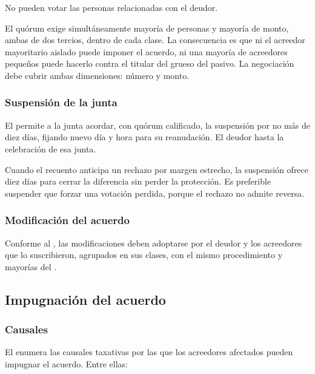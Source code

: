 No pueden votar las personas relacionadas con el deudor.

\begin{foco}
El quórum exige simultáneamente mayoría de personas y mayoría de monto, ambas de dos
tercios, dentro de cada clase. La consecuencia es que ni el acreedor mayoritario aislado
puede imponer el acuerdo, ni una mayoría de acreedores pequeños puede hacerlo contra el
titular del grueso del pasivo. La negociación debe cubrir ambas dimensiones: número y monto.
\end{foco}

\subsubsection{Suspensión de la junta}

El  permite a la junta acordar, con quórum calificado, la suspensión por no más de
diez días, fijando nuevo día y hora para su reanudación. El deudor  hasta la celebración de esa junta.

\begin{practica}
Cuando el recuento anticipa un rechazo por margen estrecho, la suspensión ofrece diez días
para cerrar la diferencia sin perder la protección. Es preferible suspender que forzar una
votación perdida, porque el rechazo no admite reversa.
\end{practica}

\subsubsection{Modificación del acuerdo}

Conforme al , las modificaciones deben adoptarse por el deudor y los acreedores que
lo suscribieron, agrupados en sus clases, con el mismo procedimiento y mayorías del .

\subsection{Impugnación del acuerdo}

\subsubsection{Causales}

El  enumera las causales taxativas por las que los acreedores afectados pueden
impugnar el acuerdo. Entre ellas:

